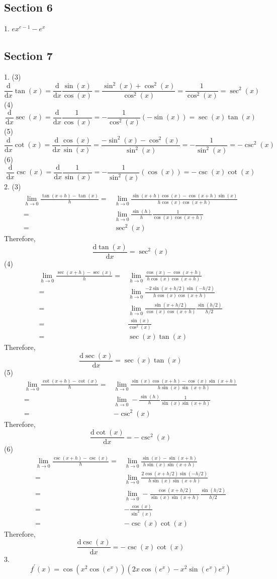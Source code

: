 \subsection{Section 6}
1. $ex^{e-1}-e^x$

\subsection{Section 7}
1. (3)
$$\frac{\mathrm d}{\mathrm dx}\tan(x)=\frac{\mathrm d}{\mathrm dx}\frac{\sin(x)}{\cos(x)}=\frac{\sin^2(x)+\cos^2(x)}{\cos^2(x)}=\frac{1}{\cos^2(x)}=\sec^2(x)$$
(4)
$$\frac{\mathrm d}{\mathrm dx}\sec(x)=\frac{\mathrm d}{\mathrm dx}\frac{1}{\cos(x)}=-\frac{1}{\cos^2(x)}(-\sin(x))=\sec(x)\tan(x)$$
(5)
$$\frac{\mathrm d}{\mathrm dx}\cot(x)=\frac{\mathrm d}{\mathrm dx}\frac{\cos(x)}{\sin(x)}=\frac{-\sin^2(x)-\cos^2(x)}{\sin^2(x)}=-\frac{1}{\sin^2(x)}=-\csc^2(x)$$
(6)
$$\frac{\mathrm d}{\mathrm dx}\csc(x)=\frac{\mathrm d}{\mathrm dx}\frac{1}{\sin(x)}=-\frac{1}{\sin^2(x)}(\cos(x))=-\csc(x)\cot(x)$$
2. (3)
\begin{align*}
    \lim_{h\to0}\frac{\tan(x+h)-\tan(x)}{h}
    =&\lim_{h\to0}\frac{\sin(x+h)\cos(x)-\cos(x+h)\sin(x)}{h\cos(x)\cos(x+h)}\\
    =&\lim_{h\to0}\frac{\sin(h)}{h}\frac{1}{\cos(x)\cos(x+h)}\\
    =&\sec^2(x)
\end{align*}
Therefore,
$$\frac{\mathrm d\tan(x)}{\mathrm dx}=\sec^2(x)$$
(4)
\begin{align*}
    \lim_{h\to0}\frac{\sec(x+h)-\sec(x)}{h}
    =&\lim_{h\to0}\frac{\cos(x)-\cos(x+h)}{h\cos(x)\cos(x+h)}\\
    =&\lim_{h\to0}\frac{-2\sin(x+h/2)\sin(-h/2)}{h\cos(x)\cos(x+h)}\\
    =&\lim_{h\to0}\frac{\sin(x+h/2)}{\cos(x)\cos(x+h)}\frac{\sin(h/2)}{h/2}\\
    =&\frac{\sin(x)}{\cos^2(x)}\\
    =&\sec(x)\tan(x)
\end{align*}
Therefore,
$$\frac{\mathrm d\sec(x)}{\mathrm dx}=\sec(x)\tan(x)$$
(5)
\begin{align*}
    \lim_{h\to0}\frac{\cot(x+h)-\cot(x)}{h}
    =&\lim_{h\to0}\frac{\sin(x)\cos(x+h)-\cos(x)\sin(x+h)}{h\sin(x)\sin(x+h)}\\
    =&\lim_{h\to0}-\frac{\sin(h)}{h}\frac{1}{\sin(x)\sin(x+h)}\\
    =&-\csc^2(x)
\end{align*}
Therefore,
$$\frac{\mathrm d\cot(x)}{\mathrm dx}=-\csc^2(x)$$
(6)
\begin{align*}
    \lim_{h\to0}\frac{\csc(x+h)-\csc(x)}{h}
    =&\lim_{h\to0}\frac{\sin(x)-\sin(x+h)}{h\sin(x)\sin(x+h)}\\
    =&\lim_{h\to0}\frac{2\cos(x+h/2)\sin(-h/2)}{h\sin(x)\sin(x+h)}\\
    =&\lim_{h\to0}-\frac{\cos(x+h/2)}{\sin(x)\sin(x+h)}\frac{\sin(h/2)}{h/2}\\
    =&-\frac{\cos(x)}{\sin^2(x)}\\
    =&-\csc(x)\cot(x)
\end{align*}
Therefore,
$$\frac{\mathrm d\csc(x)}{\mathrm dx}=-\csc(x)\cot(x)$$
3.
$$f^\prime(x)=\cos(x^2\cos(e^x))(2x\cos(e^x)-x^2\sin(e^x)e^x)$$

